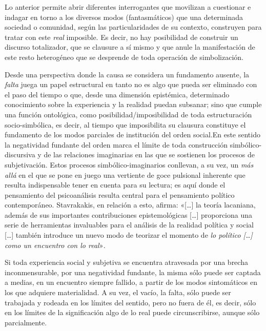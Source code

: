 Lo anterior permite abrir diferentes interrogantes que movilizan a cuestionar e indagar en torno a los diversos modos (fantasmáticos) que una determinada sociedad o comunidad, según las particularidades de su contexto, construyen para tratar con este \emph{real} imposible. Es decir, no hay posibilidad de construir un discurso totalizador, que se clausure a sí mismo y que anule la manifestación de este resto heterogéneo que se desprende de toda operación de simbolización.

Desde una perspectiva donde la causa se considera un fundamento ausente, la\emph{ falta} juega un papel estructural en tanto no es algo que pueda ser eliminado con el paso del tiempo o que, desde una dimensión epistémica, determinado conocimiento sobre la experiencia y la realidad puedan subsanar; sino que cumple una función ontológica, como posibilidad/imposibilidad de toda estructuración socio-simbólica, es decir, al tiempo que imposibilita su clausura constituye el fundamento de los modos parciales de institución del orden social.En este sentido la negatividad fundante del orden marca el límite de toda construcción simbólico-discursiva y de las relaciones imaginarias en las que se sostienen los procesos de subjetivación. Estos procesos simbólico-imaginarios conllevan, a su vez, un \emph{más allá }en el que se pone en juego una vertiente de goce pulsional inherente que resulta indispensable tener en cuenta para su lectura; es aquí donde el pensamiento del psicoanálisis resulta central para el pensamiento político contemporáneo. Stavrakakis, en relación a esto, afirma: «{[}\ldots{]} la teoría lacaniana, además de sus importantes contribuciones epistemológicas {[}\ldots{]} proporciona una serie de herramientas invaluables para el análisis de la realidad política y social {[}\ldots{]} también introduce un nuevo modo de teorizar el momento de \emph{lo político {[}\ldots{}{]} como un encuentro con lo real}»\emph{.}

Si toda experiencia social y subjetiva se encuentra atravesada por una brecha inconmensurable, por una negatividad fundante, la misma sólo puede ser captada a medias, en un encuentro siempre fallido, a partir de los modos sintomáticos en los que adquiere materialidad. A su vez, el vacío, la falta, sólo puede ser trabajada y rodeada en los límites del sentido, pero no fuera de él, es decir, sólo en los límites de la significación algo de lo real puede circunscribirse, aunque sólo parcialmente.

